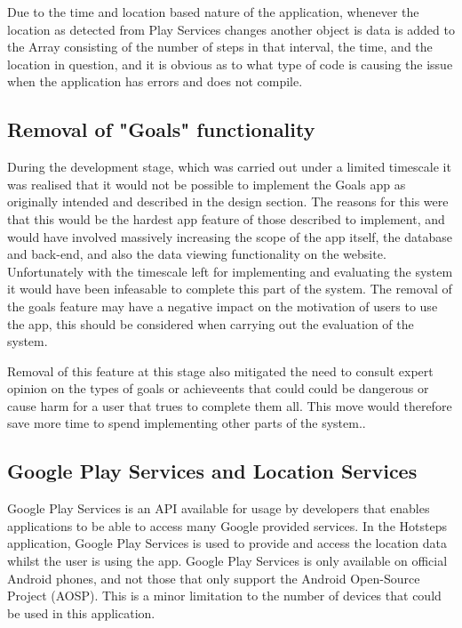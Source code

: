 \documentclass{l4proj}
\begin{document}
Due to the time and location based nature of the application, whenever the location as detected from Play Services changes another object is data is added to the Array consisting of the number of steps in that interval, the time, and the location in question,  and it is obvious as to what type of code is causing the issue when the application has errors and does not compile.

\subsection{Removal of "Goals" functionality}

During the development stage, which was carried out under a limited timescale it was realised that it would not be possible to implement the Goals app as originally intended and described in the design section. The reasons for this were that this would be the hardest app feature of those described to implement, and would have involved massively increasing the scope of the app itself, the database and back-end, and also the data viewing functionality on the website. Unfortunately with the timescale left for implementing and evaluating the system it would have been infeasable to complete this part of the system. The removal of the goals feature may have a negative impact on the motivation of users to use the app, this should be considered when carrying out the evaluation of the system. 

Removal of this feature at this stage also mitigated the need to consult expert opinion on the types of goals or achieveents that could could be dangerous or cause harm for a user that trues to complete them all. This move would therefore save more time to spend implementing other parts of the system..

\subsection{Google Play Services and Location Services}

Google Play Services is an API available for usage by developers that enables applications to be able to access many Google provided services. In the Hotsteps application, Google Play Services is used to provide and access the location data whilst the user is using the app. Google Play Services is only available on official Android phones, and not those that only support the Android Open-Source Project (AOSP). This is a minor limitation to the number of devices that could be used in this application.
\end{document}
